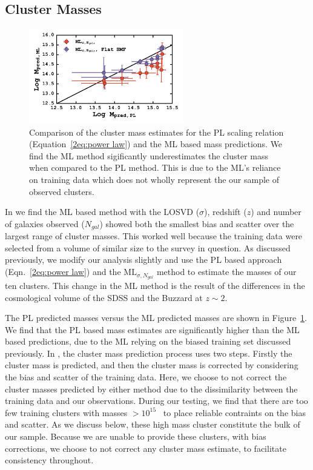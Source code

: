 \subsection{Cluster Masses}
\begin{figure}[t] 
	\begin{center}
		\includegraphics[width=0.6\textwidth]{figures2/massCompare.pdf} 
	\end{center}
	\caption[PL estimated cluster versus ML predicted cluster mass]{Comparison of the cluster mass estimates for the PL scaling relation (Equation~\ref{2eq:power law}) and the ML based mass predictions. We find the ML method sigificantly underestimates the cluster mass when compared to the PL method. This is due to the ML's reliance on training data which does not wholly represent the our sample of observed clusters.}
 \label{2fig: ML comparison} 
\end{figure}

In  we find the ML based method with the LOSVD ($\sigma$), redshift ($z$) and number of galaxies observed ($N_{gal}$) showed both the smallest bias and scatter over the largest range of cluster masses. This worked well because the training data were selected from a volume of similar size to the survey in question. As discussed previously, we modify our analysis slightly and use the PL based approach (Eqn.~\ref{2eq:power law}) and the $\mathrm{ML}_{\sigma, N_{gal}}$ method to estimate the masses of our ten clusters. This change in the ML method is the result of the differences in the cosmological volume of the SDSS and the Buzzard at $z\sim2$.  

The PL predicted masses versus the ML predicted masses are shown in Figure~\ref{2fig: ML comparison}. We find that the PL based mass estimates are significantly higher than the ML based predictions, due to the ML relying on the biased training set discussed previously. In , the cluster mass prediction process uses two steps. Firstly the cluster mass is predicted, and then the cluster mass is corrected by considering the bias and scatter of the training data. Here, we choose to not correct the cluster masses predicted by either method due to the dissimilarity between the training data and our observations. During our testing, we find that there are too few training clusters with masses $> 10^{15}$ \Msol\ to place reliable contraints on the bias and scatter. As we discuss below, these high mass cluster constitute the bulk of our sample. Because we are unable to provide these clusters, with bias corrections, we choose to not correct any cluster mass estimate, to facilitate consistency throughout. 

